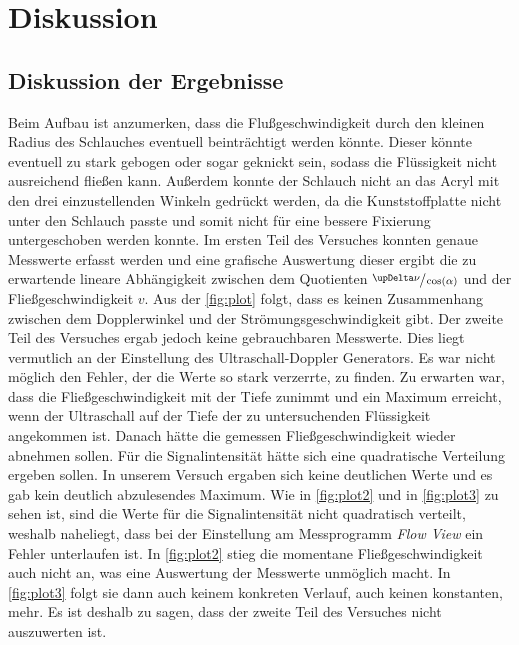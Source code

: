 \section{Diskussion}
\label{sec:Diskussion}

\subsection{Diskussion der Ergebnisse}
\label{subsec:diskErg}
Beim Aufbau ist anzumerken, dass die Flußgeschwindigkeit durch den kleinen Radius des Schlauches eventuell beinträchtigt werden könnte.
Dieser könnte eventuell zu stark gebogen oder sogar geknickt sein, sodass die Flüssigkeit nicht ausreichend fließen kann.
Außerdem konnte der Schlauch nicht an das Acryl mit den drei einzustellenden Winkeln gedrückt werden, da die Kunststoffplatte nicht 
unter den Schlauch passte und somit nicht für eine bessere Fixierung untergeschoben werden konnte.\newline
Im ersten Teil des Versuches konnten genaue Messwerte erfasst werden und eine grafische Auswertung dieser ergibt die zu erwartende lineare Abhängigkeit
zwischen dem Quotienten $\sfrac{\upDelta\nu}{\cos(\alpha)}$ und der Fließgeschwindigkeit $v$.
Aus der \autoref{fig:plot} folgt, dass es keinen Zusammenhang zwischen dem Dopplerwinkel und der Strömungsgeschwindigkeit gibt.\newline
Der zweite Teil des Versuches ergab jedoch keine gebrauchbaren Messwerte. Dies liegt vermutlich an der Einstellung des Ultraschall-Doppler Generators.
Es war nicht möglich den Fehler, der die Werte so stark verzerrte, zu finden. Zu erwarten war, dass die Fließgeschwindigkeit mit der Tiefe zunimmt
und ein Maximum erreicht, wenn der Ultraschall auf der Tiefe der zu untersuchenden Flüssigkeit angekommen ist. Danach hätte die gemessen 
Fließgeschwindigkeit wieder abnehmen sollen. Für die Signalintensität hätte sich eine quadratische Verteilung ergeben sollen.\newline
In unserem Versuch ergaben sich keine deutlichen Werte und es gab kein deutlich abzulesendes Maximum. Wie in \autoref{fig:plot2} und in \autoref{fig:plot3} zu sehen ist, sind
die Werte für die Signalintensität nicht quadratisch verteilt, weshalb naheliegt, dass bei der Einstellung am Messprogramm \textit{Flow View} ein Fehler unterlaufen ist.
In \autoref{fig:plot2} stieg die momentane Fließgeschwindigkeit auch nicht an, was eine Auswertung der Messwerte unmöglich macht. In \autoref{fig:plot3} folgt sie dann auch keinem 
konkreten Verlauf, auch keinen konstanten, mehr.
Es ist deshalb zu sagen, dass der zweite Teil des Versuches nicht auszuwerten ist.\newline


